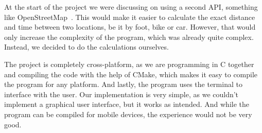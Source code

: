 At the start of the project we were discussing on using a second API, something like OpenStreetMap~\cite{openstreetmap}.
This would make it easier to calculate the exact distance and time between two locations, be it by foot, bike or car.
However, that would only increase the complexity of the program, which was already quite complex.
Instead, we decided to do the calculations ourselves.

The project is completely cross-platform, as we are programming in C together and compiling the code with the help of
CMake, which makes it easy to compile the program for any platform.
And lastly, the program uses the terminal to interface with the user.
Our implementation is very simple, as we couldn't implement a graphical user interface, but it works as intended.
And while the program can be compiled for mobile devices, the experience would not be very good.
